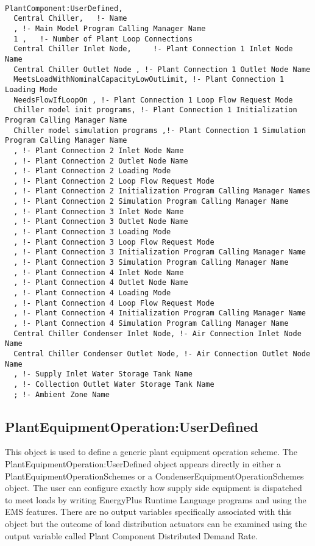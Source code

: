 \begin{lstlisting}

PlantComponent:UserDefined,
  Central Chiller,   !- Name
  , !- Main Model Program Calling Manager Name
  1 ,   !- Number of Plant Loop Connections
  Central Chiller Inlet Node,     !- Plant Connection 1 Inlet Node Name
  Central Chiller Outlet Node , !- Plant Connection 1 Outlet Node Name
  MeetsLoadWithNominalCapacityLowOutLimit, !- Plant Connection 1 Loading Mode
  NeedsFlowIfLoopOn , !- Plant Connection 1 Loop Flow Request Mode
  Chiller model init programs, !- Plant Connection 1 Initialization Program Calling Manager Name
  Chiller model simulation programs ,!- Plant Connection 1 Simulation Program Calling Manager Name
  , !- Plant Connection 2 Inlet Node Name
  , !- Plant Connection 2 Outlet Node Name
  , !- Plant Connection 2 Loading Mode
  , !- Plant Connection 2 Loop Flow Request Mode
  , !- Plant Connection 2 Initialization Program Calling Manager Names
  , !- Plant Connection 2 Simulation Program Calling Manager Name
  , !- Plant Connection 3 Inlet Node Name
  , !- Plant Connection 3 Outlet Node Name
  , !- Plant Connection 3 Loading Mode
  , !- Plant Connection 3 Loop Flow Request Mode
  , !- Plant Connection 3 Initialization Program Calling Manager Name
  , !- Plant Connection 3 Simulation Program Calling Manager Name
  , !- Plant Connection 4 Inlet Node Name
  , !- Plant Connection 4 Outlet Node Name
  , !- Plant Connection 4 Loading Mode
  , !- Plant Connection 4 Loop Flow Request Mode
  , !- Plant Connection 4 Initialization Program Calling Manager Name
  , !- Plant Connection 4 Simulation Program Calling Manager Name
  Central Chiller Condenser Inlet Node, !- Air Connection Inlet Node Name
  Central Chiller Condenser Outlet Node, !- Air Connection Outlet Node Name
  , !- Supply Inlet Water Storage Tank Name
  , !- Collection Outlet Water Storage Tank Name
  ; !- Ambient Zone Name
\end{lstlisting}

\subsection{PlantEquipmentOperation:UserDefined}\label{plantequipmentoperationuserdefined}

This object is used to define a generic plant equipment operation scheme. The PlantEquipmentOperation:UserDefined object appears directly in either a PlantEquipmentOperationSchemes or a CondenserEquipmentOperationSchemes object. The user can configure exactly how supply side equipment is dispatched to meet loads by writing EnergyPlus Runtime Language programs and using the EMS features. There are no output variables specifically associated with this object but the outcome of load distribution actuators can be examined using the output variable called Plant Component Distributed Demand Rate.

